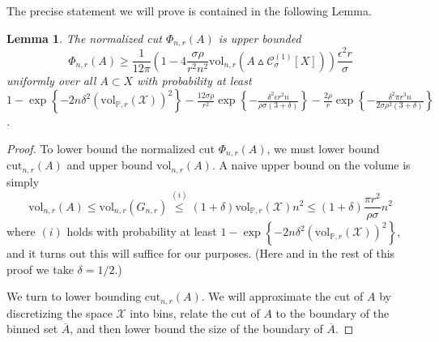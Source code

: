 \documentclass[11pt,twoside]{article}
\newtheorem{lemma}{Lemma}
\newcommand{\set}[1]{\left\{#1\right\}}
\newcommand{\vol}{\mathrm{vol}}
\newcommand{\cut}{\mathrm{cut}}
\newcommand{\1}{\mathbf{1}}
\newcommand{\Xbf}{X}             %
\newcommand{\Pbb}{\mathbb{P}}
\begin{document}
The precise statement we will prove is contained in the following Lemma.
\begin{lemma}
	\label{lem:normalized_cut_lb}
	The normalized cut $\Phi_{n,r}(A)$ is upper bounded
	\begin{equation*}
	\Phi_{n,r}(A) \geq \frac{1}{12\pi} \left(1 - 4\frac{\sigma \rho}{r^2 n^2} \vol_{n,r}(A \vartriangle \mathcal{C}_{\sigma}^{(1)}[\Xbf]) \right) \frac{\epsilon^2 r}{\sigma}
	\end{equation*}
	uniformly over all $A \subset X$ with probability at least $1 - \exp\set{-2n\delta^2(\vol_{\Pbb,r}(\mathcal{X}))^2} - \frac{12\sigma \rho}{r^2} \exp\set{-\frac{\delta^2\epsilon r^2 n}{\rho \sigma(3 + \delta)}} - \frac{2\rho}{r}\exp\set{-\frac{\delta^2\pi r^3n}{2\sigma\rho^2(3 + \delta)}}$.
\end{lemma}
\begin{proof}
	To lower bound the normalized cut $\Phi_{n,r}(A)$, we must lower bound $\cut_{n,r}(A)$ and upper bound $\vol_{n,r}(A)$. A naive upper bound on the volume is simply 
	\begin{equation}
	\label{eqn:normalized_cut_lb_pf4}
	\vol_{n,r}(A) \leq \vol_{n,r}(G_{n,r}) \overset{(i)}{\leq} (1 + \delta)  \vol_{\Pbb,r}(\mathcal{X}) n^2 \leq (1 + \delta)\frac{\pi r^2}{\rho \sigma} n^2
	\end{equation}
	where $(i)$ holds with probability at least $1 - \exp\set{-2n\delta^2(\vol_{\Pbb,r}(\mathcal{X}))^2}$, and it turns out this will suffice for our purposes. (Here and in the rest of this proof we take $\delta = 1/2$.)
	
	We turn to lower bounding $\cut_{n,r}(A)$. We will approximate the cut of $A$ by discretizing the space $\mathcal{X}$ into bins, relate the cut of $A$ to the boundary of the binned set $\overline{A}$, and then lower bound the size of the boundary of $\overline{A}$.
	

\end{proof}
\end{document}
